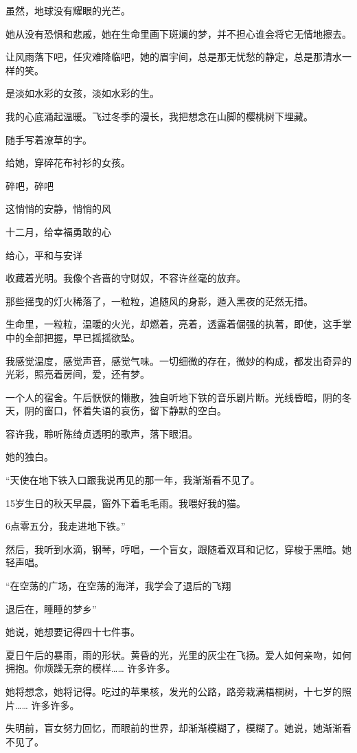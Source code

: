 \documentclass[12pt,a4paper]{article}
\begin{document}
		虽然，地球没有耀眼的光芒。


		她从没有恐惧和悲戚，她在生命里画下斑斓的梦，并不担心谁会将它无情地擦去。

		让风雨落下吧，任灾难降临吧，她的眉宇间，总是那无忧愁的静定，总是那清水一样的笑。

		是淡如水彩的女孩，淡如水彩的生。


		我的心底涌起温暖。飞过冬季的漫长，我把想念在山脚的樱桃树下埋藏。

		随手写着潦草的字。

		给她，穿碎花布衬衫的女孩。


		碎吧，碎吧

		这悄悄的安静，悄悄的风

		十二月，给幸福勇敢的心

		给心，平和与安详

	\endwriting



		收藏着光明。我像个吝啬的守财奴，不容许丝毫的放弃。


		那些摇曳的灯火稀落了，一粒粒，追随风的身影，遁入黑夜的茫然无措。\par
		生命里，一粒粒，温暖的火光，却燃着，亮着，透露着倔强的执著，即使，这手掌中的全部把握，早已摇摇欲坠。

		我感觉温度，感觉声音，感觉气味。一切细微的存在，微妙的构成，都发出奇异的光彩，照亮着房间，爱，还有梦。\par
		一个人的宿舍。午后恹恹的懒散，独自听地下铁的音乐剧片断。光线昏暗，阴的冬天，阴的窗口，怀着失语的哀伤，留下静默的空白。\par
		容许我，聆听陈绮贞透明的歌声，落下眼泪。

		她的独白。

		“天使在地下铁入口跟我说再见的那一年，我渐渐看不见了。\par
		15岁生日的秋天早晨，窗外下着毛毛雨。我喂好我的猫。\par
		6点零五分，我走进地下铁。”

		然后，我听到水滴，钢琴，哼唱，一个盲女，跟随着双耳和记忆，穿梭于黑暗。她轻声唱。

		“在空荡的广场，在空荡的海洋，我学会了退后的飞翔\par
		退后在，睡睡的梦乡”

		她说，她想要记得四十七件事。\par
		夏日午后的暴雨，雨的形状。黄昏的光，光里的灰尘在飞扬。爱人如何亲吻，如何拥抱。你烦躁无奈的模样…… 许多许多。\par
		她将想念，她将记得。吃过的苹果核，发光的公路，路旁栽满梧桐树，十七岁的照片…… 许多许多。\par
		失明前，盲女努力回忆，而眼前的世界，却渐渐模糊了，模糊了。她说，她渐渐看不见了。
\end{document}
